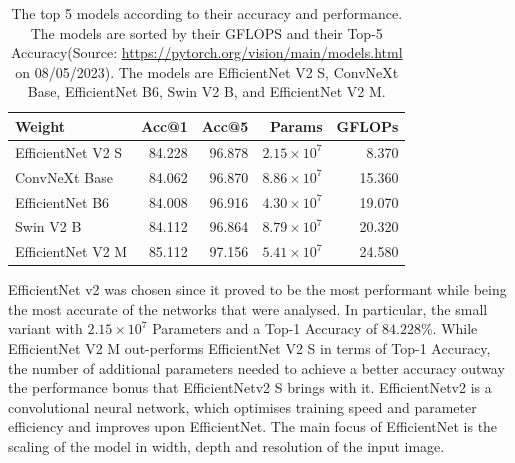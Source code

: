 \begin{table}[htbp]
  \caption[Top 5 models for Accuracy and Performance]{The top 5 models according to their accuracy and performance. The models are sorted by their GFLOPS and their Top-5 Accuracy(Source: \url{https://pytorch.org/vision/main/models.html} on 08/05/2023). The models are EfficientNet V2 S, ConvNeXt Base, EfficientNet B6, Swin V2 B, and EfficientNet V2 M.}
  \label{tab:network_comparison}
  \centering
  \begin{tabular}{lrrrr}
    \hline
            Weight &  Acc@1 &  Acc@5 &   Params &  GFLOPs \\
    \hline
  EfficientNet V2 S & 84.228 & 96.878 & $2.15 \times 10^7$ &   8.370 \\
      ConvNeXt Base & 84.062 & 96.870 & $8.86 \times 10^7$ &  15.360 \\
    EfficientNet B6 & 84.008 & 96.916 & $4.30 \times 10^7$ &  19.070 \\
          Swin V2 B & 84.112 & 96.864 & $8.79 \times 10^7$ &  20.320 \\
  EfficientNet V2 M & 85.112 & 97.156 & $5.41 \times 10^7$ &  24.580 \\
  \hline
  \end{tabular}
\end{table}

EfficientNet v2 was chosen since it proved to be the most performant while being the most accurate of the networks that were analysed. In particular, the small variant with $2.15 \times 10^7$ Parameters and a Top-1 Accuracy of $84.228\%$\cite{tan2021efficientnetv2}.  While EfficientNet V2 M out-performs EfficientNet V2 S in terms of Top-1 Accuracy, the number of additional parameters needed to achieve a better accuracy outway the performance bonus that EfficientNetv2 S brings with it. EfficientNetv2 is a convolutional neural network, which optimises training speed and parameter efficiency and improves upon EfficientNet\cite{tan2020efficientnet}. The main focus of EfficientNet is the scaling of the model in width, depth and resolution of the input image. 

\FloatBarrier